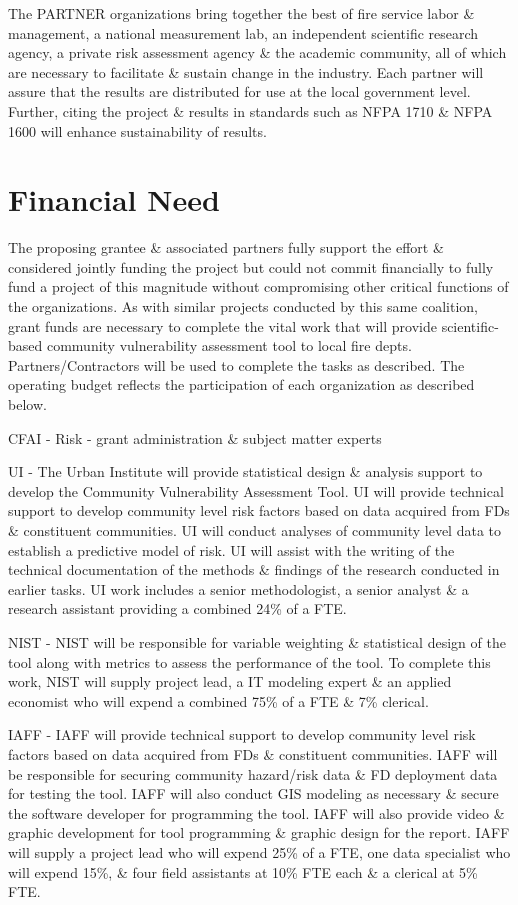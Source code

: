 \documentclass[12pt,letterpaper]{article}
\begin{document}
The PARTNER organizations bring together the best of fire service labor \& management, a national measurement lab, an independent scientific research agency, a private risk assessment agency \& the academic community, all of which are necessary to facilitate \& sustain change in the industry. Each partner will assure that the results are distributed for use at the local government level. Further, citing the project \& results in standards such as NFPA 1710 \& NFPA 1600 will enhance sustainability of results.


\section{Financial Need}
\label{sec:money}
The proposing grantee \& associated partners fully support the effort \& considered jointly funding the project but could not commit financially to fully fund a project of this magnitude without compromising other critical functions of the organizations. As with similar projects conducted by this same coalition, grant funds are necessary to complete the vital work that will provide scientific-based community vulnerability assessment tool to local fire depts.  Partners/Contractors will be used to complete the tasks as described. The operating budget reflects the participation of each organization as described below.

CFAI - Risk - grant administration \& subject matter experts

UI - The Urban Institute will provide statistical design \& analysis support to develop the Community Vulnerability Assessment Tool.  UI will provide technical support to develop community level risk factors based on data acquired from FDs \& constituent communities. UI will conduct analyses of community level data to establish a predictive model of risk. UI will assist with the writing of the technical documentation of the methods \& findings of the research conducted in earlier tasks. UI work includes a senior methodologist, a senior analyst \& a research assistant providing a combined 24\% of a FTE. 

NIST - NIST will be responsible for variable weighting \& statistical design of the tool along with metrics to assess the performance of the tool. To complete this work, NIST will supply project lead, a IT modeling expert \& an applied economist who will expend a combined 75\% of a FTE \& 7\% clerical.

IAFF - IAFF will provide technical support to develop community level risk factors based on data acquired from FDs \& constituent communities.  IAFF will be responsible for securing community hazard/risk data \& FD deployment data for testing the tool.  IAFF will also conduct GIS modeling as necessary \& secure the software developer for programming the tool.  IAFF will also provide video \& graphic development for tool programming \& graphic design for the report.  IAFF will supply a project lead who will expend 25\% of a FTE, one data specialist who will expend 15\%, \& four field assistants at 10\% FTE each \& a clerical at 5\% FTE. 
\end{document}
